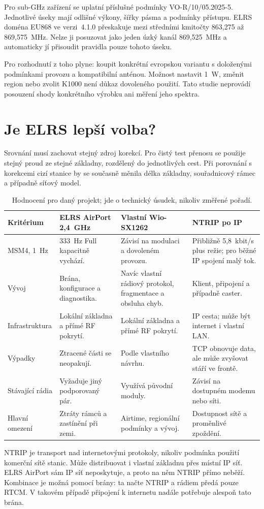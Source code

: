 \documentclass[11pt,a4paper]{article}
\begin{document}
Pro sub-GHz zařízení se uplatní příslušné podmínky VO-R/10/05.2025-5. Jednotlivé úseky mají odlišné výkony, šířky pásma a podmínky přístupu.\cite{ctu10} ELRS doména EU868 ve verzi~4.1.0 přeskakuje mezi středními kmitočty 863,275 až 869,575~MHz.\cite{fhss} Nelze ji posuzovat jako jeden úzký kanál 869,525~MHz a automaticky jí přisoudit pravidla pouze tohoto úseku.

Pro rozhodnutí z toho plyne: koupit konkrétní evropskou variantu s doloženými podmínkami provozu a kompatibilní anténou. Možnost nastavit 1~W, změnit region nebo zvolit K1000 není důkaz dovoleného použití. Tato studie neprovádí posouzení shody konkrétního výrobku ani měření jeho spektra.

\section{Je ELRS lepší volba?}
Srovnání musí zachovat stejný zdroj korekcí. Pro čistý test přenosu se použije stejný proud ze stejné základny, rozdělený do jednotlivých cest. Při porovnání s korekcemi cizí stanice by se současně měnila délka základny, souřadnicový rámec a případně síťový model.

\par
\begin{table}[htbp]\centering\small
\caption{Hodnocení pro daný projekt; jde o technický úsudek, nikoliv změřené pořadí.}
\begin{tabularx}{\linewidth}{L{27mm}YYY}
\toprule Kritérium & ELRS AirPort 2,4~GHz & Vlastní Wio-SX1262 & NTRIP po IP\\ \midrule
MSM4, 1~Hz & 333~Hz Full kapacitně vychází. & Závisí na modulaci a dovoleném provozu. & Přibližně 5,8~kbit/s plus režie; pro běžné IP spojení malý tok.\\
Vývoj & Brána, konfigurace a diagnostika. & Navíc vlastní rádiový protokol, fragmentace a obsluha chyb. & Klient, připojení a případně caster.\\
Infrastruktura & Lokální základna a přímé RF pokrytí. & Lokální základna a přímé RF pokrytí. & IP cesta; může být internet i vlastní LAN.\\
Výpadky & Ztracené části se neopakují. & Podle vlastního návrhu. & TCP obnovuje data, ale může zvyšovat stáří ve frontě.\\
Stávající rádia & Vyžaduje jiný podporovaný pár. & Využívá původní moduly. & Závisí na dostupném modemu nebo síti.\\
Hlavní omezení & Ztráty rámců a zastínění při zemi. & Airtime, regionální podmínky a vývoj. & Dostupnost sítě a proměnlivé zpoždění.\\
\bottomrule\end{tabularx}
\end{table}
\par
NTRIP je transport nad internetovými protokoly, nikoliv podmínka použití komerční sítě stanic.\cite{ntrip} Může distribuovat i vlastní základnu přes místní IP síť. ELRS AirPort sám IP síť neposkytuje, a proto na něm NTRIP přímo neběží. Kombinace je možná pomocí brány: ta načte NTRIP a rádiem předá pouze RTCM. V takovém případě připojení k internetu nadále potřebuje alespoň tato brána.
\end{document}

